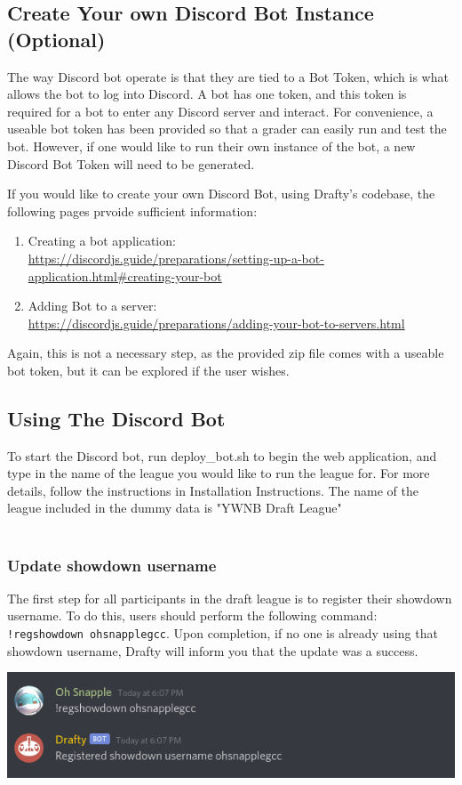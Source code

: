 \documentclass{article}
\begin{document}
\subsection*{Create Your own Discord Bot Instance (Optional)}
The way Discord bot operate is that they are tied to a Bot Token, which is what allows the bot to log into Discord.
A bot has one token, and this token is required for a bot to enter any Discord server and interact.
For convenience, a useable bot token has been provided so that a grader can easily run and test the bot. 
However, if one would like to run their own instance of the bot, a new Discord Bot Token will need to be generated.

If you would like to create your own Discord Bot, using Drafty's codebase, the following pages prvoide sufficient information:
\begin{enumerate}
  \item Creating a bot application:\\ \url{https://discordjs.guide/preparations/setting-up-a-bot-application.html#creating-your-bot}
  \item Adding Bot to a server:\\\url{https://discordjs.guide/preparations/adding-your-bot-to-servers.html}
\end{enumerate}
Again, this is not a necessary step, as the provided zip file comes with a useable bot token, but it can be explored if the user wishes.


\subsection*{Using The Discord Bot}

To start the Discord bot, run deploy\_bot.sh to begin the web application, and type in the name of the league you would like to run the league for. 
For more details, follow the instructions in Installation Instructions. 
The name of the league included in the dummy data is "YWNB Draft League"\\\\

\subsubsection*{Update showdown username}
The first step for all participants in the draft league is to register their showdown username. 
To do this, users should perform the following command: \verb|!regshowdown ohsnapplegcc|. 
Upon completion, if no one is already using that showdown username, Drafty will inform you that the update was a success.\\
\begin{center}
  \includegraphics[scale=.5]{regshowdown.png}
\end{center}
\end{document}
